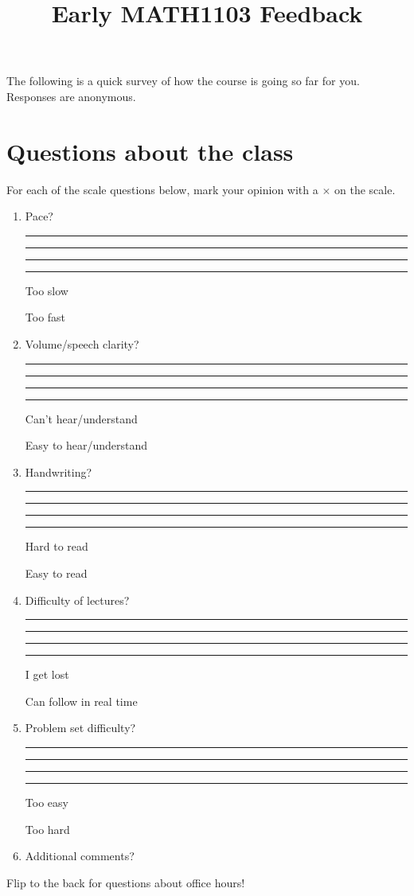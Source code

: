 \documentclass[11pt,oneside]{amsart}
\title{Early MATH1103 Feedback}
\author{}
\newcommand\ScaleLine[2]{%
  \parbox{\linewidth}{%
    \rule{0.2\linewidth}{0pt}
    \rule[-5pt]{0.4pt}{10pt}\hrulefill\rule[-5pt]{0.4pt}{10pt}%
    \rule{0.2\linewidth}{0pt}\vspace*{7pt}\newline
       \parbox{0.4\linewidth}{\centering #1}\hfill\parbox{0.4\linewidth}{\centering #2}
  }
}
\begin{document}
    \maketitle
    
    The following is a quick survey of how the course is going so far for you. Responses are anonymous.

    \section{Questions about the class}
    For each of the scale questions below, mark your opinion with a $\times$ on the scale.
    \begin{enumerate}
        \item Pace?
        
            \ScaleLine{Too slow}{Too fast}

        \item Volume/speech clarity?

        \ScaleLine{Can't hear/understand}{Easy to hear/understand}

        \item Handwriting?

        \ScaleLine{Hard to read}{Easy to read}

        \item Difficulty of lectures?
        
        \ScaleLine{I get lost}{Can follow in real time}

        \item Problem set difficulty?
        
        \ScaleLine{Too easy}{Too hard}

        \item Additional comments?
        \vfill
    \end{enumerate}

    Flip to the back for questions about office hours!
    \newpage
\end{document}
